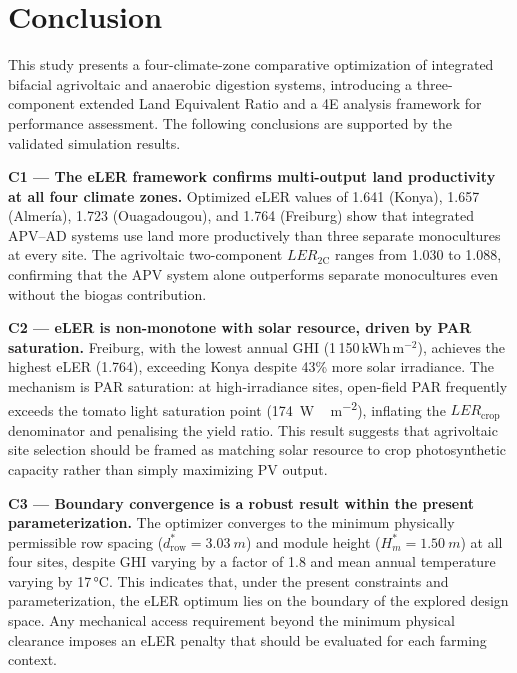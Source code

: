 
\section{Conclusion}
\label{sec:conclusion}

\hspace{1cm}This study presents a four-climate-zone comparative optimization of integrated bifacial agrivoltaic and anaerobic digestion systems, introducing a three-component extended Land Equivalent Ratio and a 4E analysis framework for performance assessment. The following conclusions are supported by the validated simulation results.

\textbf{C1 --- The eLER framework confirms multi-output land
	productivity at all four climate zones.}
Optimized eLER values of 1.641 (Konya), 1.657 (Almería), 1.723 (Ouagadougou), and 1.764 (Freiburg) show that integrated APV--AD systems use land more productively than three separate monocultures at every site. The agrivoltaic two-component $LER_{\text{2C}}$ ranges from 1.030 to 1.088, confirming that the APV system alone outperforms separate monocultures even without the biogas contribution.

\textbf{C2 --- eLER is non-monotone with solar resource, driven by
	PAR saturation.}
Freiburg, with the lowest annual GHI (1\,150\,kWh\,m$^{-2}$), achieves the highest eLER (1.764), exceeding Konya despite 43\% more solar irradiance. The mechanism is PAR saturation: at high-irradiance sites, open-field PAR frequently exceeds the tomato light saturation point (\SI{174}{W\,m^{-2}}), inflating the $LER_{\text{crop}}$ denominator and penalising the yield ratio. This result suggests that agrivoltaic site selection should be framed as matching solar resource to crop photosynthetic capacity rather than simply maximizing PV output.

\textbf{C3 --- Boundary convergence is a robust result within the present parameterization.}
The optimizer converges to the minimum physically permissible row
spacing ($d_{\text{row}}^* = \SI{3.03}{m}$) and module height
($H_m^* = \SI{1.50}{m}$) at all four sites, despite GHI varying by
a factor of 1.8 and mean annual temperature varying by
17\,\si{\celsius}. This indicates that, under the present constraints and parameterization, the eLER optimum lies on the boundary of the explored design space. Any mechanical access requirement beyond the minimum physical clearance imposes an eLER penalty that should be evaluated for each farming context.

